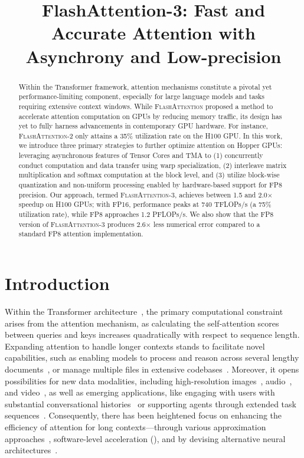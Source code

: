 \title{FlashAttention-3: Fast and Accurate Attention with Asynchrony and Low-precision}

\begin{abstract}
Within the Transformer framework, attention mechanisms constitute a pivotal yet performance-limiting component, especially for large language models and tasks requiring extensive context windows. While \textsc{FlashAttention} proposed a method to accelerate attention computation on GPUs by reducing memory traffic, its design has yet to fully harness advancements in contemporary GPU hardware. For instance, \textsc{FlashAttention-2} only attains a 35\% utilization rate on the H100 GPU. In this work, we introduce three primary strategies to further optimize attention on Hopper GPUs: leveraging asynchronous features of Tensor Cores and TMA to (1) concurrently conduct computation and data transfer using warp specialization, (2) interleave matrix multiplication and softmax computation at the block level, and (3) utilize block-wise quantization and non-uniform processing enabled by hardware-based support for FP8 precision. Our approach, termed \textsc{FlashAttention-3}, achieves between 1.5 and 2.0$\times$ speedup on H100 GPUs; with FP16, performance peaks at 740 TFLOPs/s (a 75\% utilization rate), while FP8 approaches 1.2 PFLOPs/s. We also show that the FP8 version of \textsc{FlashAttention-3} produces 2.6$\times$ less numerical error compared to a standard FP8 attention implementation.
\end{abstract}

\section{Introduction}
\label{sec:intro}

Within the Transformer architecture~\citep{vaswani2017attention}, the primary computational constraint arises from the attention mechanism, as calculating the self-attention scores between queries and keys increases quadratically with respect to sequence length. Expanding attention to handle longer contexts stands to facilitate novel capabilities, such as enabling models to process and reason across several lengthy documents~\citep{guo2021longt5,shaham2022scrolls,peng2023yarn}, or manage multiple files in extensive codebases~\citep{roziere2023code, li2023starcoder}. Moreover, it opens possibilities for new data modalities, including high-resolution images~\citep{chen2022scaling}, audio~\citep{gulati2020conformer}, and video~\citep{ho2022video}, as well as emerging applications, like engaging with users with substantial conversational histories~\citep{sun2019bert4rec} or supporting agents through extended task sequences~\citep{yao2022react}. Consequently, there has been heightened focus on enhancing the efficiency of attention for long contexts—through various approximation approaches~\citep{katharopoulos2020transformers,choromanski2020rethinking,
tay2020efficient}, software-level acceleration (\citep{rabe2021self,dao2022flashattention,kwon2023efficient}), and by devising alternative neural architectures~\citep{peng2023rwkv,sun2023retentive,gu2023mamba}.

